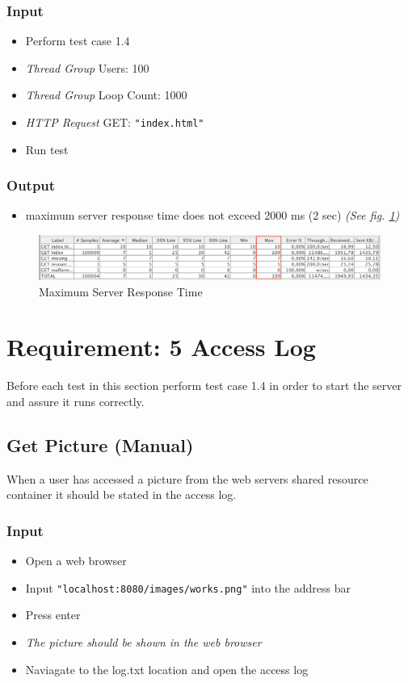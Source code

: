 \documentclass[a4paper, 12pt]{article}
\begin{document}
\subsubsection{Input}
\begin{itemize}
\item Perform test case 1.4
\item \textit{Thread Group} Users: 100
\item \textit{Thread Group} Loop Count: 1000
\item \textit{HTTP Request} GET: \texttt{"index.html"}
\item Run test
\end{itemize}

\subsubsection{Output}
\begin{itemize}
\item maximum server response time does not exceed 2000 ms (2 sec) \textit{(See fig. \ref{TC4.1})}
\end{itemize}

\begin{figure}[H]
\centering
\includegraphics[scale=0.5]{output_clarification/HighLoad.png} 
\caption{Maximum Server Response Time}
\label{TC4.1}
\end{figure}

\newpage

\section{Requirement: 5 Access Log}

Before each test in this section perform test case 1.4 in order to start the server and assure it runs correctly.

\subsection{Get Picture (Manual)}

When a user has accessed a picture from the web servers shared resource container it should be stated in the access log.

\subsubsection{Input}
\begin{itemize}
\item Open a web browser
\item Input \texttt{"localhost:8080/images/works.png"} into the address bar
\item Press enter
\item \textit{The picture should be shown in the web browser}
\item Naviagate to the log.txt location and open the access log
\end{itemize}
\end{document}

